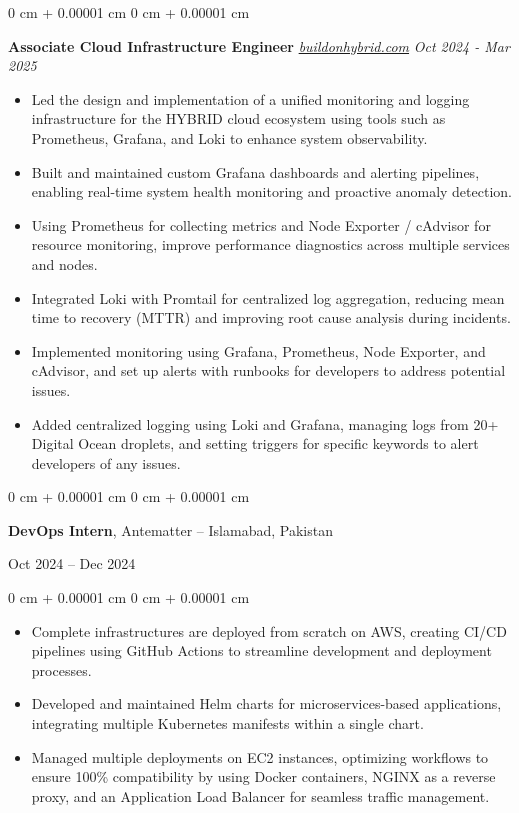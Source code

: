 \documentclass[10pt, letterpaper]{article}
\newenvironment{highlights}{
    \begin{itemize}[
        topsep=0.10 cm,
        parsep=0.10 cm,
        partopsep=0pt,
        itemsep=0pt,
        leftmargin=0 cm + 10pt
    ]
}{
    \end{itemize}
}
\newenvironment{onecolentry}{
    \begin{adjustwidth}{
        0 cm + 0.00001 cm
    }{
        0 cm + 0.00001 cm
    }
}{
    \end{adjustwidth}
}
\newenvironment{twocolentry}[2][]{
    \onecolentry
    \def\secondColumn{#2}
    \setcolumnwidth{\fill, 4.5 cm}
    \begin{paracol}{2}
}{
    \switchcolumn \raggedleft \secondColumn
    \end{paracol}
    \endonecolentry
}
\begin{document}
\begin{onecolentry}
    \textbf{Associate Cloud Infrastructure Engineer} \hfill \textit{\href{https://buildonhybrid.com}{buildonhybrid.com}} \textit{ Oct 2024 - Mar 2025}  
\vspace{0.10 cm}
    \begin{highlights}
        \item Led the design and implementation of a unified monitoring and logging infrastructure for the HYBRID cloud ecosystem using tools such as Prometheus, Grafana, and Loki to enhance system observability.
        \item Built and maintained custom Grafana dashboards and alerting pipelines, enabling real-time system health monitoring and proactive anomaly detection.
        \item Using Prometheus for collecting metrics and Node Exporter / cAdvisor for resource monitoring, improve performance diagnostics across multiple services and nodes.
        \item Integrated Loki with Promtail for centralized log aggregation, reducing mean time to recovery (MTTR) and improving root cause analysis during incidents.
        \item Implemented monitoring using Grafana, Prometheus, Node Exporter, and cAdvisor, and set up alerts with runbooks for developers to address potential issues.
        \item Added centralized logging using Loki and Grafana, managing logs from 20+ Digital Ocean droplets, and setting triggers for specific keywords to alert developers of any issues.
    \end{highlights}
\end{onecolentry}

\vspace{0.10 cm}

\begin{twocolentry}{Oct 2024 -- Dec 2024}
    \textbf{DevOps Intern}, Antematter -- Islamabad, Pakistan
\end{twocolentry}
\vspace{0.10 cm}
\begin{onecolentry}
    \begin{highlights}
        \item Complete infrastructures are deployed from scratch on AWS, creating CI/CD pipelines using GitHub Actions to streamline development and deployment processes.
        \item Developed and maintained Helm charts for microservices-based applications, integrating multiple Kubernetes manifests within a single chart.
        \item Managed multiple deployments on EC2 instances, optimizing workflows to ensure 100\% compatibility by using Docker containers, NGINX as a reverse proxy, and an Application Load Balancer for seamless traffic management.
    \end{highlights}
\end{onecolentry}
\end{document}
